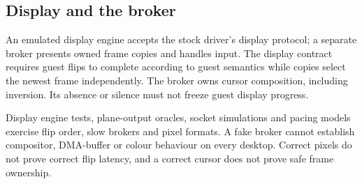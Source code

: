 \subsection{Display and the broker}

\doc An emulated display engine accepts the stock driver's display protocol; a separate
broker presents owned frame copies and handles input. The display contract requires guest flips to
complete according to guest semantics while copies select the newest frame independently.
The broker owns cursor composition, including inversion. Its absence or silence must not
freeze guest display progress.

{Display engine tests, plane-output oracles, socket simulations and pacing models exercise
flip order, slow brokers and pixel formats.}
{A fake broker cannot establish compositor, DMA-buffer or colour behaviour on every desktop.
Correct pixels do not prove correct flip latency, and a correct cursor does not prove safe
frame ownership.}
